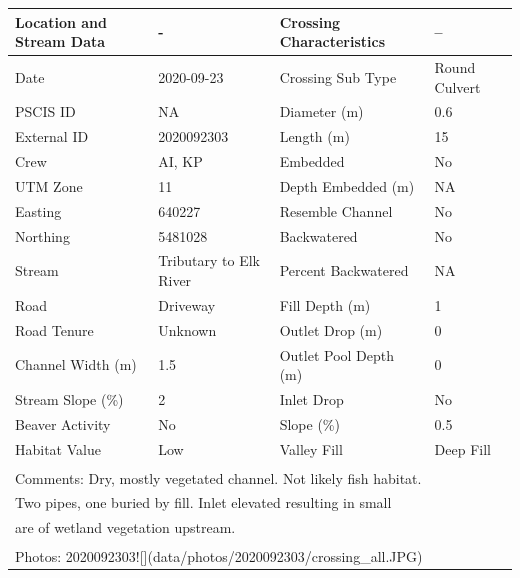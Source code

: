 \documentclass[
]{book}
\begin{document}
\begin{tabular}{l|l|l|l}
\hline
Location and Stream Data & - & Crossing Characteristics & --\\
\hline
Date & 2020-09-23 & Crossing Sub Type & Round Culvert\\
\hline
PSCIS ID & NA & Diameter (m) & 0.6\\
\hline
External ID & 2020092303 & Length (m) & 15\\
\hline
Crew & AI, KP & Embedded & No\\
\hline
UTM Zone & 11 & Depth Embedded (m) & NA\\
\hline
Easting & 640227 & Resemble Channel & No\\
\hline
Northing & 5481028 & Backwatered & No\\
\hline
Stream & Tributary to Elk River & Percent Backwatered & NA\\
\hline
Road & Driveway & Fill Depth (m) & 1\\
\hline
Road Tenure & Unknown & Outlet Drop (m) & 0\\
\hline
Channel Width (m) & 1.5 & Outlet Pool Depth (m) & 0\\
\hline
Stream Slope (\%) & 2 & Inlet Drop & No\\
\hline
Beaver Activity & No & Slope (\%) & 0.5\\
\hline
Habitat Value & Low & Valley Fill & Deep Fill\\
\hline
\multicolumn{4}{l}{\textsuperscript{} Comments: Dry, mostly vegetated channel. Not likely fish habitat.}\\
\multicolumn{4}{l}{Two pipes, one buried by fill. Inlet elevated resulting in small}\\
\multicolumn{4}{l}{are of wetland vegetation upstream.}\\
\multicolumn{4}{l}{\textsuperscript{} Photos: 2020092303![](data/photos/2020092303/crossing\_all.JPG)}\\
\end{tabular}
\end{document}
